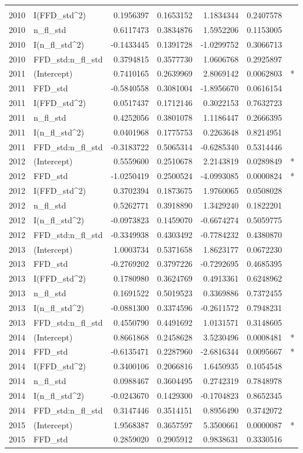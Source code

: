 \documentclass[]{article}
\begin{document}
\begin{longtable}[]{@{}llrrrrl@{}}
&\tabularnewline
2010 & I(FFD\_std\^{}2) & 0.1956397 & 0.1653152 & 1.1834344 & 0.2407578
&\tabularnewline
2010 & n\_fl\_std & 0.6117473 & 0.3834876 & 1.5952206 & 0.1153005
&\tabularnewline
2010 & I(n\_fl\_std\^{}2) & -0.1433445 & 0.1391728 & -1.0299752 &
0.3066713 &\tabularnewline
2010 & FFD\_std:n\_fl\_std & 0.3794815 & 0.3577730 & 1.0606768 &
0.2925897 &\tabularnewline
2011 & (Intercept) & 0.7410165 & 0.2639969 & 2.8069142 & 0.0062803 &
*\tabularnewline
2011 & FFD\_std & -0.5840558 & 0.3081004 & -1.8956670 & 0.0616154
&\tabularnewline
2011 & I(FFD\_std\^{}2) & 0.0517437 & 0.1712146 & 0.3022153 & 0.7632723
&\tabularnewline
2011 & n\_fl\_std & 0.4252056 & 0.3801078 & 1.1186447 & 0.2666395
&\tabularnewline
2011 & I(n\_fl\_std\^{}2) & 0.0401968 & 0.1775753 & 0.2263648 &
0.8214951 &\tabularnewline
2011 & FFD\_std:n\_fl\_std & -0.3183722 & 0.5065314 & -0.6285340 &
0.5314446 &\tabularnewline
2012 & (Intercept) & 0.5559600 & 0.2510678 & 2.2143819 & 0.0289849 &
*\tabularnewline
2012 & FFD\_std & -1.0250419 & 0.2500524 & -4.0993085 & 0.0000824 &
*\tabularnewline
2012 & I(FFD\_std\^{}2) & 0.3702394 & 0.1873675 & 1.9760065 & 0.0508028
&\tabularnewline
2012 & n\_fl\_std & 0.5262771 & 0.3918890 & 1.3429240 & 0.1822201
&\tabularnewline
2012 & I(n\_fl\_std\^{}2) & -0.0973823 & 0.1459070 & -0.6674274 &
0.5059775 &\tabularnewline
2012 & FFD\_std:n\_fl\_std & -0.3349938 & 0.4303492 & -0.7784232 &
0.4380870 &\tabularnewline
2013 & (Intercept) & 1.0003734 & 0.5371658 & 1.8623177 & 0.0672230
&\tabularnewline
2013 & FFD\_std & -0.2769202 & 0.3797226 & -0.7292695 & 0.4685395
&\tabularnewline
2013 & I(FFD\_std\^{}2) & 0.1780980 & 0.3624769 & 0.4913361 & 0.6248962
&\tabularnewline
2013 & n\_fl\_std & 0.1691522 & 0.5019523 & 0.3369886 & 0.7372455
&\tabularnewline
2013 & I(n\_fl\_std\^{}2) & -0.0881300 & 0.3374596 & -0.2611572 &
0.7948231 &\tabularnewline
2013 & FFD\_std:n\_fl\_std & 0.4550790 & 0.4491692 & 1.0131571 &
0.3148605 &\tabularnewline
2014 & (Intercept) & 0.8661868 & 0.2458628 & 3.5230496 & 0.0008481 &
*\tabularnewline
2014 & FFD\_std & -0.6135471 & 0.2287960 & -2.6816344 & 0.0095667 &
*\tabularnewline
2014 & I(FFD\_std\^{}2) & 0.3400106 & 0.2066816 & 1.6450935 & 0.1054548
&\tabularnewline
2014 & n\_fl\_std & 0.0988467 & 0.3604495 & 0.2742319 & 0.7848978
&\tabularnewline
2014 & I(n\_fl\_std\^{}2) & -0.0243670 & 0.1429300 & -0.1704823 &
0.8652345 &\tabularnewline
2014 & FFD\_std:n\_fl\_std & 0.3147446 & 0.3514151 & 0.8956490 &
0.3742072 &\tabularnewline
2015 & (Intercept) & 1.9568387 & 0.3657597 & 5.3500661 & 0.0000087 &
*\tabularnewline
2015 & FFD\_std & 0.2859020 & 0.2905912 & 0.9838631 & 0.3330516

\end{longtable}
\end{document}
